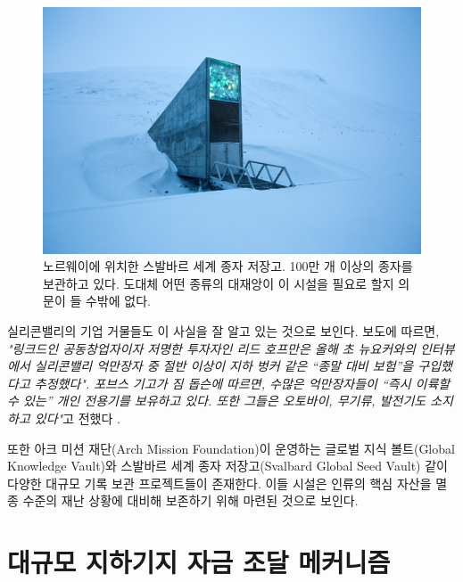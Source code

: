 \documentclass[10pt,twocolumn,letterpaper]{article}
\begin{document}
\begin{figure}[t]
\begin{center}
   \includegraphics[width=1\linewidth]{svalbard.jpg}
\end{center}
   \caption{노르웨이에 위치한 스발바르 세계 종자 저장고. 100만 개 이상의 종자를 보관하고 있다\cite{24}. 도대체 어떤 종류의 대재앙이 이 시설을 필요로 할지 의문이 들 수밖에 없다.}
\label{fig:8}
\label{fig:onecol}
\end{figure}

실리콘밸리의 기업 거물들도 이 사실을 잘 알고 있는 것으로 보인다. 보도에 따르면, \textit{"링크드인 공동창업자이자 저명한 투자자인 리드 호프만은 올해 초 뉴요커와의 인터뷰에서 실리콘밸리 억만장자 중 절반 이상이 지하 벙커 같은 “종말 대비 보험”을 구입했다고 추정했다". 포브스 기고가 짐 돕슨에 따르면, 수많은 억만장자들이 “즉시 이륙할 수 있는” 개인 전용기를 보유하고 있다. 또한 그들은 오토바이, 무기류, 발전기도 소지하고 있다"}고 전했다 \cite{28}.

또한 아크 미션 재단(Arch Mission Foundation)이 운영하는 글로벌 지식 볼트(Global Knowledge Vault)\cite{29}와 스발바르 세계 종자 저장고(Svalbard Global Seed Vault) \cite{30} 같이 다양한 대규모 기록 보관 프로젝트들이 존재한다. 이들 시설은 인류의 핵심 자산을 멸종 수준의 재난 상황에 대비해 보존하기 위해 마련된 것으로 보인다.

\section{대규모 지하기지 자금 조달 메커니즘}
\end{document}
